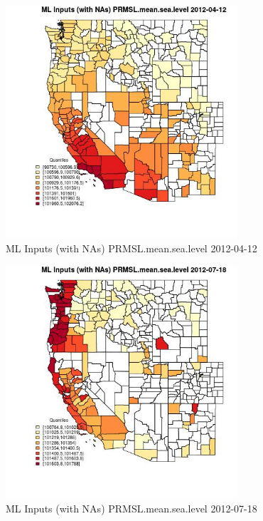 \begin{figure} 
\centering  
\includegraphics[width=0.77\textwidth]{Code_Outputs/Report_ML_input_PM25_Step4_part_e_de_duplicated_aves_compiled_2019-05-14wNAs_CountyPRMSLmeansealevelMean2012-04-12_2012-04-12.jpg} 
\caption{\label{fig:Report_ML_input_PM25_Step4_part_e_de_duplicated_aves_compiled_2019-05-14wNAsCountyPRMSLmeansealevelMean2012-04-12_2012-04-12}ML Inputs (with NAs) PRMSL.mean.sea.level 2012-04-12} 
\end{figure} 
 

\begin{figure} 
\centering  
\includegraphics[width=0.77\textwidth]{Code_Outputs/Report_ML_input_PM25_Step4_part_e_de_duplicated_aves_compiled_2019-05-14wNAs_CountyPRMSLmeansealevelMean2012-07-18_2012-07-18.jpg} 
\caption{\label{fig:Report_ML_input_PM25_Step4_part_e_de_duplicated_aves_compiled_2019-05-14wNAsCountyPRMSLmeansealevelMean2012-07-18_2012-07-18}ML Inputs (with NAs) PRMSL.mean.sea.level 2012-07-18} 
\end{figure} 
 

